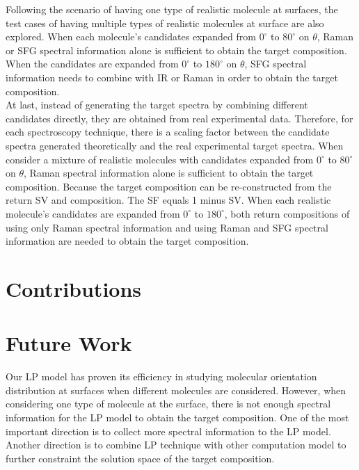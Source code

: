Following the scenario of having one type of realistic molecule at surfaces, the test cases of having multiple types of realistic molecules at surface are also explored. When each molecule's candidates expanded from $0^{\circ}$ to $80^{\circ}$ on $\theta$, Raman or SFG spectral information alone is sufficient to obtain the target composition. When the candidates are expanded from $0^{\circ}$ to $180^{\circ}$ on $\theta$, SFG spectral information needs to combine with IR or Raman in order to obtain the target composition. \\

At last, instead of generating the target spectra by combining different candidates directly, they are obtained from real experimental data. Therefore, for each spectroscopy technique, there is a scaling factor between the candidate spectra generated theoretically and the real experimental target spectra. When consider a mixture of realistic molecules with candidates expanded from $0^{\circ}$ to $80^{\circ}$ on $\theta$, Raman spectral information alone is sufficient to obtain the target composition. Because the target composition can be re-constructed from the return SV and composition. The SF equals 1 minus SV. When each realistic molecule's candidates are expanded from $0^{\circ}$ to $180^{\circ}$, both return compositions of using only Raman spectral information and using Raman and SFG spectral information are needed to obtain the target composition. \\
\section{Contributions}


\section{Future Work}
Our LP model has proven its efficiency in studying molecular orientation distribution at surfaces when different molecules are considered. However, when considering one type of molecule at the surface, there is not enough spectral information for the LP model to obtain the target composition. One of the most important direction is to collect more spectral information to the LP model. Another direction is to combine LP technique with other computation model to further constraint the solution space of the target composition.








